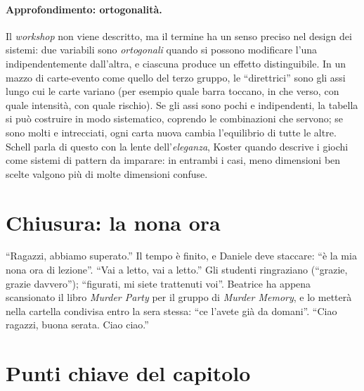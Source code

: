 \paragraph{Approfondimento: ortogonalità.} Il \emph{workshop} non viene descritto, ma il
termine ha un senso preciso nel design dei sistemi: due variabili sono \emph{ortogonali}
quando si possono modificare l'una indipendentemente dall'altra, e ciascuna produce un
effetto distinguibile. In un mazzo di carte-evento come quello del terzo gruppo, le
``direttrici'' sono gli assi lungo cui le carte variano (per esempio quale barra toccano,
in che verso, con quale intensità, con quale rischio). Se gli assi sono pochi e
indipendenti, la tabella si può costruire in modo sistematico, coprendo le combinazioni
che servono; se sono molti e intrecciati, ogni carta nuova cambia l'equilibrio di tutte le
altre. Schell parla di questo con la lente dell'\emph{eleganza}, Koster quando descrive i
giochi come sistemi di pattern da imparare: in entrambi i casi, meno dimensioni ben scelte
valgono più di molte dimensioni confuse.

\section{Chiusura: la nona ora}
\label{a11:sec:chiusura}

``Ragazzi, abbiamo superato.'' Il tempo è finito, e Daniele deve staccare: ``è la mia nona
ora di lezione''. ``Vai a letto, vai a letto.'' Gli studenti ringraziano (``grazie,
grazie davvero''); ``figurati, mi siete trattenuti voi''. Beatrice ha appena scansionato
il libro \emph{Murder Party} per il gruppo di \emph{Murder Memory}, e lo metterà nella
cartella condivisa entro la sera stessa: ``ce l'avete già da domani''. ``Ciao ragazzi,
buona serata. Ciao ciao.''

\section*{Punti chiave del capitolo}

